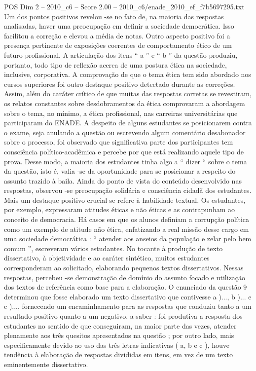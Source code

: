 \begin{textsample}{POS Dim 2 – 2010\_c6 – Score 2.00 – 2010\_c6/enade\_2010\_ef\_f7b5697295.txt}
Um dos pontos positivos revelou -se no fato de, na maioria das respostas analisadas, haver uma preocupação em definir a sociedade democrática.
Isso facilitou a correção e elevou a média de notas.
Outro aspecto positivo foi a presença pertinente de exposições coerentes de comportamento ético de um futuro profissional.
A articulação dos itens “ a ” e “ b ” da questão produziu, portanto, todo tipo de reflexão acerca de uma postura ética na sociedade, inclusive, corporativa.
A comprovação de que o tema ética tem sido abordado nos cursos superiores foi outro destaque positivo detectado durante as correções.
Assim, além do caráter crítico de que muitas das respostas corretas se revestiram, os relatos constantes sobre desdobramentos da ética comprovaram a abordagem sobre o tema, no mínimo, a ética profissional, nas carreiras universitárias que participaram do ENADE.
A despeito de alguns estudantes se posicionarem contra o exame, seja anulando a questão ou escrevendo algum comentário desabonador sobre o processo, foi observado que significativa parte dos participantes tem consciência político-acadêmica e percebe por que está realizando aquele tipo de prova.
Desse modo, a maioria dos estudantes tinha algo a “ dizer “ sobre o tema da questão, isto é, valia -se da oportunidade para se posicionar a respeito do assunto trazido à baila.
Ainda do ponto de vista do conteúdo desenvolvido nas respostas, observou -se preocupação solidária e consciência cidadã dos estudantes.
Mais um destaque positivo crucial se refere à habilidade textual.
Os estudantes, por exemplo, expressaram atitudes éticas e não éticas e as contrapunham ao conceito de democracia.
Há casos em que os alunos definiam a corrupção política como um exemplo de atitude não ética, enfatizando a real missão desse cargo em uma sociedade democrática : “ atender aos anseios da população e zelar pelo bem comum ”, escreveram vários estudantes.
No tocante à produção de texto dissertativo, à objetividade e ao caráter sintético, muitos estudantes corresponderam ao solicitado, elaborando pequenos textos dissertativos.
Nessas respostas, percebeu -se demonstração de domínio do assunto focado e utilização dos textos de referência como base para a elaboração.
O enunciado da questão 9 determinou que fosse elaborado um texto dissertativo que contivesse a )..., b )... e c )..., fornecendo um encaminhamento para as respostas que conduziu tanto a um resultado positivo quanto a um negativo, a saber : foi produtiva a resposta dos estudantes no sentido de que conseguiram, na maior parte das vezes, atender plenamente aos três quesitos apresentados na questão ; por outro lado, mais especificamente devido ao uso das três letras indicativas ( a, b e c ), houve tendência à elaboração de respostas divididas em itens, em vez de um texto eminentemente dissertativo.

\end{textsample}
